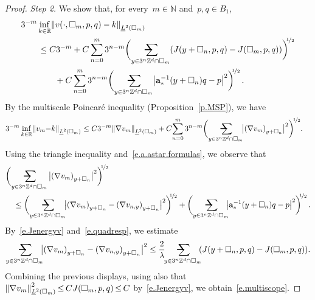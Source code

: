 \documentclass[11pt,twoside]{article} %
\makeatletter
\let\oldsquare\square %
\renewcommand{\square}{\oldsquare}
\numberwithin{equation}{section}
\theoremstyle{definition}
\let\originalleft\left
\let\originalright\right
\renewcommand{\left}{\mathopen{}\mathclose\bgroup\originalleft}
\renewcommand{\right}{\aftergroup\egroup\originalright}
\newcommand*{\N}{\ensuremath{\mathbb{N}}}
\newcommand*{\R}{\ensuremath{\mathbb{R}}}
\newcommand*{\Zd}{\ensuremath{\mathbb{Z}^d}}
\renewcommand{\a}{\mathbf{a}}
\newcommand{\cu}{\square}
\newcommand{\avsum}{\mathop{\mathpalette\avsuminner\relax}\displaylimits}
\newcommand\avsuminner[2]{%
  {\sbox0{$\m@th#1\sum$}%
   \vphantom{\usebox0}%
   \ooalign{%
     \hidewidth
     \smash{\,\rule[.23em]{8.8pt}{1.1pt} \relax}%
     \hidewidth\cr
   ~$\m@th#1\sum$\cr
   }%
  }%
}
\makeatother
\begin{document}
\begin{proof}
\emph{Step 2.} We show that,
for every~$m\in\N$ and~$p,q\in B_1$, 
\begin{align}
\label{e.multiscope}
\lefteqn{
3^{-m} 
\inf_{k\in\R} 
\left\| v(\cdot,\cu_m,p,q) - k \right\|_{\underline{L}^2(\cu_m)} 
} \qquad & 
\notag \\ &
\leq
C3^{-m} 
+
C
\sum_{n=0}^{{m}} 3^{n-m} 
\biggl(
\avsum_{y\in 3^{n}\Zd\cap \cu_m} 
( J(y+\cu_{n},p,q) - J (\cu_m,p,q) )
\biggr)^{\!\!\nicefrac12}
\notag \\ & \qquad 
+
C\sum_{n=0}^{{m}} 3^{n-m} 
\biggl(\avsum_{y\in 3^n\Zd\cap \cu_{m}} 
\left| \a_*^{-1}(y+\cu_n) q - p\right|^2
\biggr)^{\!\!\nicefrac12}
\,.
\end{align}
By the multiscale Poincar\'e inequality (Proposition~\ref{p.MSP}), we have
\begin{align*}
3^{-m} 
\inf_{k\in\R} 
\left\| v_m {-} k \right\|_{\underline{L}^2(\cu_m)} 
&
\leq 
C3^{-m} \left\| \nabla v_m \right\|_{\underline{L}^2(\cu_m)} 
+
C \! 
\sum_{n=0}^{m} 3^{n-m} 
\biggl( \avsum_{y\in 3^n\Zd\cap \cu_{m}} \!\!
\big| \left( \nabla v_m \right)_{y+\cu_n} \big|^2 \biggr)^{\!\nicefrac12}
.
\end{align*}
Using the triangle inequality and~\eqref{e.a.astar.formulas}, we observe that 
\begin{align*}
\lefteqn{
\biggl(
\avsum_{y\in 3^n\Zd\cap \cu_{m}} 
\big| \left( \nabla v_m \right)_{y+\cu_n} \big|^2\biggr)^{\!\!\nicefrac12}
} \quad & 
\\ &
\leq 
\biggl(\avsum_{y\in 3^n\Zd\cap \cu_{m}} \!\!
\big|  \left( \nabla v_{m} \right)_{y+\cu_n} -  \left( \nabla v_{n,y} \right)_{y+\cu_n} \big|^2\biggr)^{\!\!\nicefrac12}
+
\biggl(\avsum_{y\in 3^n\Zd\cap \cu_{m}} \!\!
\left| \a_*^{-1}(y+\cu_n) q - p\right|^2
\biggr)^{\!\!\nicefrac12}
\,.
\end{align*}
By~\eqref{e.Jenergyv} and~\eqref{e.quadresp}, we estimate
\begin{align*}
\avsum_{y\in 3^n\Zd\cap \cu_{m}} \!\!\!
\big|  \left( \nabla v_{m} \right)_{y+\cu_n}  - \left( \nabla v_{n,y} \right)_{y+\cu_n} \big|^2
\leq 
\frac2\lambda \!\!
\avsum_{y\in 3^{n}\Zd\cap \cu_m} \!\!
( J(y+\cu_{n},p,q) - J (\cu_m,p,q) )
.
\end{align*}
Combining the previous displays, using also that~$\left\| \nabla v_m \right\|_{\underline{L}^2(\cu_m)}^2  \hspace{-1pt}  \leq \hspace{-1pt} CJ(\cu_m,p,q) \hspace{-1pt} \leq \hspace{-1pt} C$ by~\eqref{e.Jenergyv}, we obtain~\eqref{e.multiscope}.



\end{proof}
\end{document}
